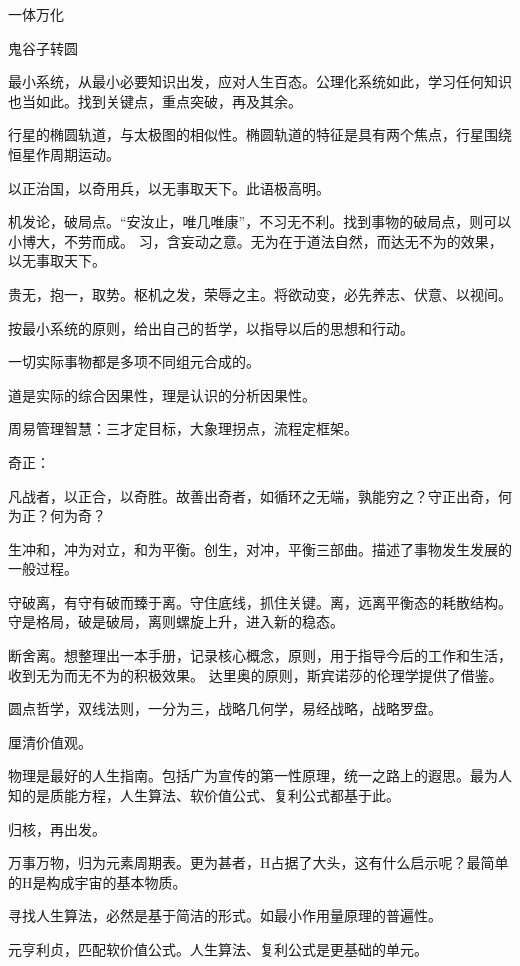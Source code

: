 一体万化

鬼谷子转圆

最小系统，从最小必要知识出发，应对人生百态。公理化系统如此，学习任何知识也当如此。找到关键点，重点突破，再及其余。

行星的椭圆轨道，与太极图的相似性。椭圆轨道的特征是具有两个焦点，行星围绕恒星作周期运动。

以正治国，以奇用兵，以无事取天下。此语极高明。

机发论，破局点。“安汝止，唯几唯康”，不习无不利。找到事物的破局点，则可以小博大，不劳而成。
习，含妄动之意。无为在于道法自然，而达无不为的效果，以无事取天下。

贵无，抱一，取势。枢机之发，荣辱之主。将欲动变，必先养志、伏意、以视间。

按最小系统的原则，给出自己的哲学，以指导以后的思想和行动。

一切实际事物都是多项不同组元合成的。

道是实际的综合因果性，理是认识的分析因果性。

周易管理智慧：三才定目标，大象理拐点，流程定框架。

奇正：

凡战者，以正合，以奇胜。故善出奇者，如循环之无端，孰能穷之？守正出奇，何为正？何为奇？

生冲和，冲为对立，和为平衡。创生，对冲，平衡三部曲。描述了事物发生发展的一般过程。

守破离，有守有破而臻于离。守住底线，抓住关键。离，远离平衡态的耗散结构。
守是格局，破是破局，离则螺旋上升，进入新的稳态。

断舍离。想整理出一本手册，记录核心概念，原则，用于指导今后的工作和生活，收到无为而无不为的积极效果。
达里奥的原则，斯宾诺莎的伦理学提供了借鉴。

圆点哲学，双线法则，一分为三，战略几何学，易经战略，战略罗盘。

厘清价值观。

物理是最好的人生指南。包括广为宣传的第一性原理，统一之路上的遐思。最为人知的是质能方程，人生算法、软价值公式、复利公式都基于此。

归核，再出发。

万事万物，归为元素周期表。更为甚者，H占据了大头，这有什么启示呢？最简单的H是构成宇宙的基本物质。

寻找人生算法，必然是基于简洁的形式。如最小作用量原理的普遍性。

元亨利贞，匹配软价值公式。人生算法、复利公式是更基础的单元。

